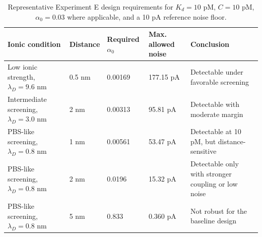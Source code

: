 
\begin{table}[H]
\centering
\caption{Representative Experiment E design requirements for $K_d=10$ pM, $C=10$ pM, $\alpha_0=0.03$ where applicable, and a 10 pA reference noise floor.}
\label{tab:design_requirements}
\small
\setlength{\tabcolsep}{3pt}
\begin{tabular}{@{}p{}p{}p{}p{}p{}@{}}
\toprule
\textbf{Ionic condition} & \textbf{Distance} & \textbf{Required $\alpha_0$} & \textbf{Max. allowed noise} & \textbf{Conclusion}\\
\midrule
Low ionic strength, $\lambda_D=9.6$ nm & 0.5 nm & 0.00169 & 177.15 pA & Detectable under favorable screening\\
Intermediate screening, $\lambda_D=3.0$ nm & 2 nm & 0.00313 & 95.81 pA & Detectable with moderate margin\\
PBS-like screening, $\lambda_D=0.8$ nm & 1 nm & 0.00561 & 53.47 pA & Detectable at 10 pM, but distance-sensitive\\
PBS-like screening, $\lambda_D=0.8$ nm & 2 nm & 0.0196 & 15.32 pA & Detectable only with stronger coupling or low noise\\
PBS-like screening, $\lambda_D=0.8$ nm & 5 nm & 0.833 & 0.360 pA & Not robust for the baseline design\\
\bottomrule
\end{tabular}
\end{table}
